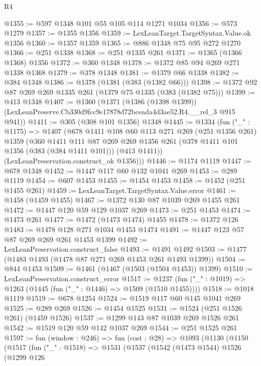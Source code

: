\begin{lexlean}{R4}
\begin{coremodule}
@1355 := @597 @1348 @101 @55 @105 @114 @1271 @1034
@1356 := @573 @1279
@1357 := @1355 @1356
@1359 := LexLeanTarget.TargetSyntax.Value.ok @1356
@1360 := @1357 @1359
@1365 := @886 @1348 @75 @95 @272 @1270
@1366 := @251 @1338
@1368 := @251 @1335 @261
@1371 := @1365 (@1366 @1368) @1356
@1372 := @360 @1348
@1378 := @1372 @85 @94 @269 @271 @1338 @1368
@1379 := @378 @1348
@1381 := @1379 @66 @1338
@1382 := @384 @1348
@1386 := @1378 (@1381 (@383 (@1382 @66)))
@1398 := @1372 @92 @87 @269 @269 @1335 @261 (@1379 @75 @1335 (@383 (@1382 @75)))
@1399 := @413 @1348
@1407 := @1360
    (@1371
      (@1386 (@1398 @1399))
      (LexLeanPreserve.Cb330d9fcc9e17878d72bceada4d3ae52.R4.__rel_3 @915 @941))
@1411 := @305 (@308 @101 @1356) @1348
@1445 := @1334
    (fun ("_" : @1175) =>
    @1407
      (@678
        @1411
        @108
        @60
        @113
        @271
        @269
        (@251 @1356 @261)
        @1359
        (@360
          @1411
          @111
          @87
          @269
          @269
          @1356
          @261
          (@378 @1411 @101 @1356 (@383 (@384 @1411 @101)))
          (@413 @1411))
        (LexLeanPreservation.construct_ok @1356)))
@1446 := @1174 @1119
@1447 := @678 @1348
@1452 := @1447 @117 @60 @132 @1041 @269
@1453 := @289 @1119
@1454 := @607 @1453
@1455 := @1454 @1453
@1458 := @1452 (@251 @1455 @261)
@1459 := LexLeanTarget.TargetSyntax.Value.error
@1461 := @1458 (@1459 @1455)
@1467 := @1372 @130 @87 @1039 @269 @1455 @261
@1472 := @1447 @120 @59 @129 @1037 @269
@1473 := @251 @1453
@1474 := @1473 @261
@1477 := @1472 (@1473 @1474) @1455
@1478 := @1372 @126
@1483 := @1478 @128 @271 @1034 @1453 @1474
@1491 := @1447 @123 @57 @87 @269 @269 @261 @1453 @1399
@1492 := LexLeanPreservation.construct_false
@1493 := @1491 @1492
@1503 := @1477 (@1483 @1493 (@1478 @87 @271 @269 @1453 @261 @1493 @1399))
@1504 := @844 @1453
@1509 := @1461 (@1467 (@1503 (@1504 @1453)) @1399)
@1510 := LexLeanPreservation.construct_error
@1517 := @1237 (fun ("_" : @1019) => @1263 (@1445 (fun ("_" : @1446) => @1509 (@1510 @1455))))
@1518 := @1018 @1119
@1519 := @678 @1254
@1524 := @1519 @117 @60 @145 @1041 @269
@1525 := @289 @269
@1526 := @1454 @1525
@1531 := @1524 (@251 @1526 @261) (@1459 @1526)
@1537 := @1299 @143 @87 @1039 @269 @1526 @261
@1542 := @1519 @120 @59 @142 @1037 @269
@1544 := @251 @1525 @261
@1597 := fun (window : @246) =>
  fun (cost : @28) =>
  @1093
    (@1130
      (@1150
        (@1517
          (fun ("_" : @1518) =>
          @1531
            (@1537
              (@1542
                (@1473 @1544)
                @1526
                (@1299
                  @126

\end{coremodule}
\end{lexlean}
